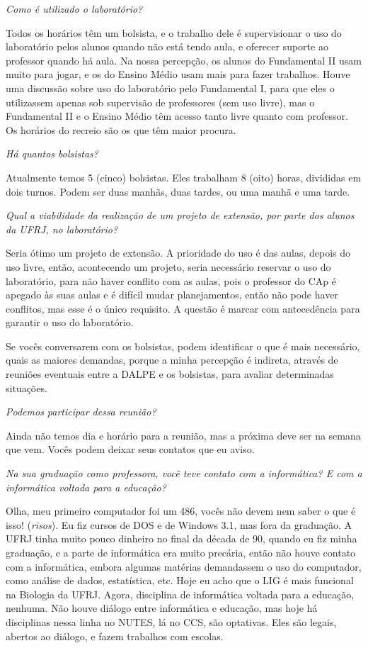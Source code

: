\textit{Como é utilizado o laboratório?}

Todos os horários têm um bolsista, e o trabalho dele é supervisionar o uso do laboratório pelos alunos quando não está tendo aula, e oferecer suporte ao professor quando há aula. Na nossa percepção, os alunos do Fundamental II usam muito para jogar, e os do Ensino Médio usam mais para fazer trabalhos. Houve uma discussão sobre uso do laboratório pelo Fundamental I, para que eles o utilizassem apenas sob supervisão de professores (sem uso livre), mas o Fundamental II e o Ensino Médio têm acesso tanto livre quanto com professor. Os horários do recreio são os que têm maior procura.

\textit{Há quantos bolsistas?}

Atualmente temos 5 (cinco) bolsistas. Eles trabalham 8 (oito) horas, divididas em dois turnos. Podem ser duas manhãs, duas tardes, ou uma manhã e uma tarde.

\textit{Qual a viabilidade da realização de um projeto de extensão, por parte dos alunos da UFRJ, no laboratório?}

Seria ótimo um projeto de extensão. A prioridade do uso é das aulas, depois do uso livre, então, acontecendo um projeto, seria necessário reservar o uso do laboratório, para não haver conflito com as aulas, pois o professor do CAp é apegado às suas aulas e é difícil mudar planejamentos, então não pode haver conflitos, mas esse é o único requisito. A questão é marcar com antecedência para garantir o uso do laboratório.

Se vocês conversarem com os bolsistas, podem identificar o que é mais necessário, quais as maiores demandas, porque a minha percepção é indireta, através de reuniões eventuais entre a DALPE e os bolsistas, para avaliar determinadas situações.

\textit{Podemos participar dessa reunião?}

Ainda não temos dia e horário para a reunião, mas a próxima deve ser na semana que vem. Vocês podem deixar seus contatos que eu aviso.

\textit{Na sua graduação como professora, você teve contato com a informática? E com a informática voltada para a educação?}

Olha, meu primeiro computador foi um 486, vocês não devem nem saber o que é isso! (\textit{risos}). Eu fiz cursos de DOS e de Windows 3.1, mas fora da graduação. A UFRJ tinha muito pouco dinheiro no final da década de 90, quando eu fiz minha graduação, e a parte de informática era muito precária, então não houve contato com a informática, embora algumas matérias demandassem o uso do computador, como análise de dados, estatística, etc. Hoje eu acho que o LIG é mais funcional na Biologia da UFRJ. Agora, disciplina de informática voltada para a educação, nenhuma. Não houve diálogo entre informática e educação, mas hoje há disciplinas nessa linha no NUTES, lá no CCS, são optativas. Eles são legais, abertos ao diálogo, e fazem trabalhos com escolas.


